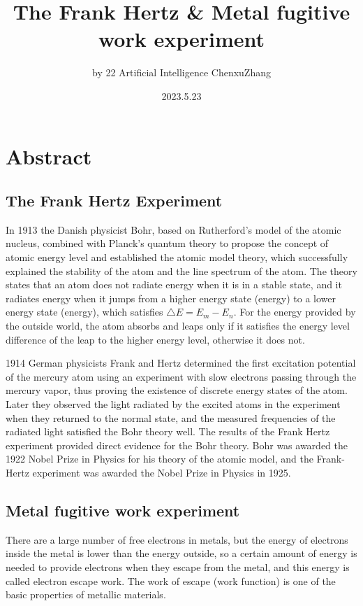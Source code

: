 \documentclass[UTF8]{article}
\title{The Frank Hertz \& Metal fugitive work experiment}
\author{by 22 Artificial Intelligence ChenxuZhang}
\date{2023.5.23}
\begin{document}
	
	\fancyfoot[C]{\thepage}
	
	\maketitle
	\tableofcontents
	\newpage
	
	\section{Abstract}
\subsection{The Frank Hertz Experiment}
In 1913 the Danish physicist Bohr, based on Rutherford's model of the atomic nucleus, combined with Planck's quantum theory to propose the concept of atomic energy level and established the atomic model theory, which successfully explained the stability of the atom and the line spectrum of the atom. The theory states that an atom does not radiate energy when it is in a stable state, and it radiates energy when it jumps from a higher energy state (energy) to a lower energy state (energy), which satisfies $\bigtriangleup E=E_m-E_n$. For the energy provided by the outside world, the atom absorbs and leaps only if it satisfies the energy level difference of the leap to the higher energy level, otherwise it does not.

1914 German physicists Frank and Hertz determined the first excitation potential of the mercury atom using an experiment with slow electrons passing through the mercury vapor, thus proving the existence of discrete energy states of the atom. Later they observed the light radiated by the excited atoms in the experiment when they returned to the normal state, and the measured frequencies of the radiated light satisfied the Bohr theory well. The results of the Frank Hertz experiment provided direct evidence for the Bohr theory. Bohr was awarded the 1922 Nobel Prize in Physics for his theory of the atomic model, and the Frank-Hertz experiment was awarded the Nobel Prize in Physics in 1925.
 \subsection{Metal fugitive work experiment}
There are a large number of free electrons in metals, but the energy of electrons inside the metal is lower than the energy outside, so a certain amount of energy is needed to provide electrons when they escape from the metal, and this energy is called electron escape work. The work of escape (work function) is one of the basic properties of metallic materials.
\end{document}
